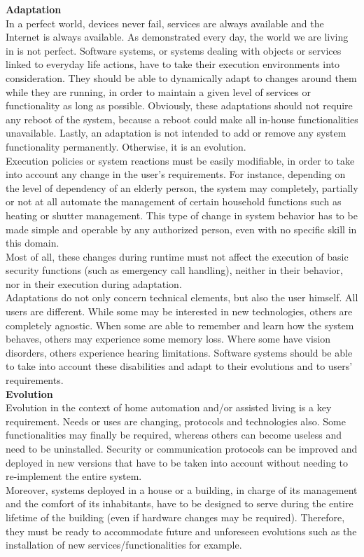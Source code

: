{\bf Adaptation}\\
In a perfect world, devices never fail, services are always available and the Internet is always available. As demonstrated every day, the world we are living in is not perfect. Software systems, or systems dealing with objects or services linked to everyday life actions, have to take their execution environments into consideration. They should be able to dynamically adapt to changes around them while they are running, in order to maintain a given level of services or functionality as long as possible. Obviously, these adaptations should not require any reboot of the system, because a reboot could make all in-house functionalities unavailable. Lastly, an adaptation is not intended to add or remove any system functionality permanently. Otherwise, it is an evolution.\\
Execution policies or system reactions must be easily modifiable, in order to take into account any change in the user's requirements. For instance, depending on the level of dependency of an elderly person, the system may completely, partially or not at all automate the management of certain household functions such as heating or shutter management. This type of change in system behavior has to be made simple and operable by any authorized person, even with no specific skill in this domain.\\
Most of all, these changes during runtime must not affect the execution of basic security functions (such as emergency call handling), neither in their behavior, nor in their execution during adaptation.\\
Adaptations do not only concern technical elements, but also the user himself. All users are different. While some may be interested in new technologies, others are completely agnostic. When some are able to remember and learn how the system behaves, others may experience some memory loss. Where some have vision disorders, others experience hearing limitations. Software systems should be able to take into account these disabilities and adapt to their evolutions and to users' requirements.\\

{\bf Evolution}\\
Evolution in the context of home automation and/or assisted living is a key requirement. Needs or uses are changing, protocols and technologies also. Some functionalities may finally be required, whereas others can become useless and need to be uninstalled. Security or communication protocols can be improved and deployed in new versions that have to be taken into account without needing to re-implement the entire system.\\
Moreover, systems deployed in a house or a building, in charge of its management and the comfort of its inhabitants, have to be designed to serve during the entire lifetime of the building (even if hardware changes may be required). Therefore, they must be ready to accommodate future and unforeseen evolutions such as the installation of new services/functionalities for example.\\

